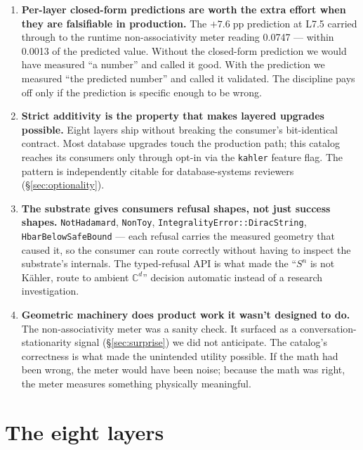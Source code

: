 \documentclass[11pt,letterpaper]{article}
\begin{document}
\begin{enumerate}[nosep]
\item \textbf{Per-layer closed-form predictions are worth the extra
  effort when they are falsifiable in production.} The
  $+7.6\;\text{pp}$ prediction at L7.5 carried through to the
  runtime non-associativity meter reading 0.0747 --- within 0.0013 of
  the predicted value. Without the closed-form prediction we would
  have measured ``a number'' and called it good. With the prediction
  we measured ``the predicted number'' and called it validated. The
  discipline pays off only if the prediction is specific enough to
  be wrong.
\item \textbf{Strict additivity is the property that makes layered
  upgrades possible.} Eight layers ship without breaking the
  consumer's bit-identical contract. Most database upgrades touch the
  production path; this catalog reaches its consumers only through
  opt-in via the \texttt{kahler} feature flag. The pattern is
  independently citable for database-systems reviewers
  (\S\ref{sec:optionality}).
\item \textbf{The substrate gives consumers refusal shapes, not just
  success shapes.} \texttt{NotHadamard}, \texttt{NonToy},
  \texttt{IntegralityError::DiracString},
  \texttt{HbarBelowSafeBound} --- each refusal carries the measured
  geometry that caused it, so the consumer can route correctly
  without having to inspect the substrate's internals. The
  typed-refusal API is what made the ``$S^n$ is not K\"ahler, route
  to ambient $\mathbb{C}^d$'' decision automatic instead of a
  research investigation.
\item \textbf{Geometric machinery does product work it wasn't
  designed to do.} The non-associativity meter was a sanity check.
  It surfaced as a conversation-stationarity signal
  (\S\ref{sec:surprise}) we did not anticipate. The catalog's
  correctness is what made the unintended utility possible. If the
  math had been wrong, the meter would have been noise; because the
  math was right, the meter measures something physically
  meaningful.
\end{enumerate}


\section{The eight layers}
\label{sec:layers}
\end{document}
